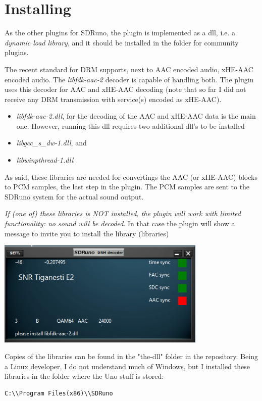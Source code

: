 \documentclass[10pt]{article}
\begin{document}
\section{Installing}
As  the other plugins for SDRuno, the plugin is implemented as
a dll, i.e. a {\em dynamic load library}, and it should be installed
in the folder for community plugins.
\par
The recent standard for DRM supports, next to AAC encoded audio, xHE-AAC 
encoded audio. The {\em libfdk-aac-2} decoder is capable of handling both.
The plugin uses this decoder for AAC and xHE-AAC decoding (note that so far
I did not receive any DRM transmission with service(s) encoded as xHE-AAC).
\begin{itemize}
\item
{\em libfdk-aac-2.dll}, for the decoding of the AAC and xHE-AAC data is the main one.
However, running this dll requires two additional dll's to be installed
\item {\em libgcc\_s\_dw-1.dll}, and
\item {\em libwinpthread-1.dll}
\end{itemize}
As said, these libraries are needed for convertings the AAC
(or xHE-AAC) blocks to PCM samples, the last step in the
plugin. The PCM samples are sent to the SDRuno system for the
actual sound output.
\par
{\em If (one of) these libraries is NOT installed, the plugin will work
with limited functionality: no sound will be decoded}.
In that case the plugin will
show a message to invite you to install the library (libraries)

\includegraphics[width=100mm]{lib-not-found.png}

Copies of the libraries can be found in the "the-dll" folder
in the repository.
Being a Linux developer, I do not understand much of Windows, but I
installed these libraries in the folder
where the Uno stuff is stored:
\begin{verbatim}
C:\\Program Files(x86)\\SDRuno
\end{verbatim}
\end{document}
